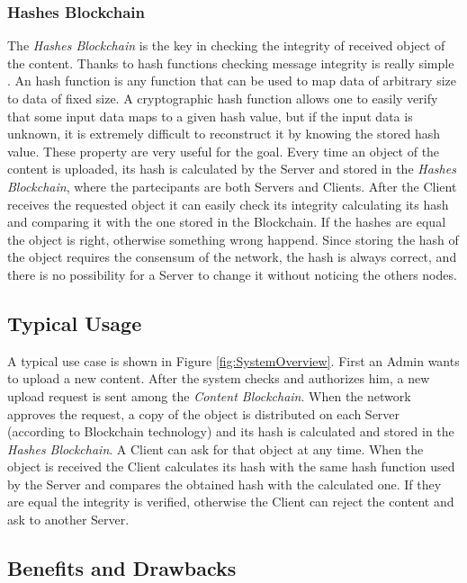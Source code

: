 \documentclass[hidelinks,conference,compsoc]{IEEEtran}
\begin{document}
\subsubsection{Hashes Blockchain}
The \textit{Hashes Blockchain} is the key in checking the integrity of received object of the content. Thanks to hash functions checking message integrity is really simple \cite{tsudik1992message}. An hash function is any function that can be used to map data of arbitrary size to data of fixed size. A cryptographic hash function allows one to easily verify that some input data maps to a given hash value, but if the input data is unknown, it is extremely difficult to reconstruct it by knowing the stored hash value. These property are very useful for the goal. Every time an object of the content is uploaded, its hash is calculated by the Server and stored in the \textit{Hashes Blockchain}, where the partecipants are both Servers and Clients. After the Client receives the requested object it can easily check its integrity calculating its hash and comparing it with the one stored in the Blockchain. If the hashes are equal the object is right, otherwise something wrong happend. Since storing the hash of the object requires the consensum of the network, the hash is always correct, and there is no possibility for a Server to change it without noticing the others nodes. 
	
\subsection{Typical Usage}
A typical use case is shown in Figure \ref{fig:SystemOverview}. First an Admin wants to upload a new content. After the system checks and authorizes him, a new upload request is sent among the \textit{Content Blockchain}. When the network approves the request, a copy of the object is distributed on each Server (according to Blockchain technology) and its hash is calculated and stored in the \textit{Hashes Blockchain}. A Client can ask for that object at any time. When the object is received the Client calculates its hash with the same hash function used by the Server and compares the obtained hash with the calculated one. If they are equal the integrity is verified, otherwise the Client can reject the content and ask to another Server.

\subsection{Benefits and Drawbacks}
\end{document}
